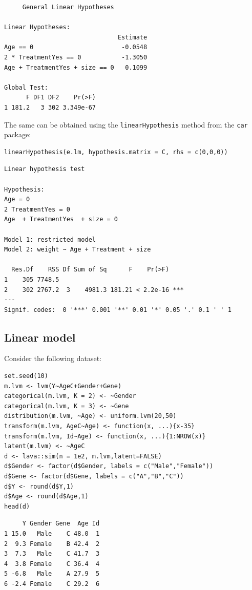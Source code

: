 \documentclass{article}
\begin{document}
\begin{verbatim}
	 General Linear Hypotheses

Linear Hypotheses:
                               Estimate
Age == 0                        -0.0548
2 * TreatmentYes == 0           -1.3050
Age + TreatmentYes + size == 0   0.1099

Global Test:
      F DF1 DF2    Pr(>F)
1 181.2   3 302 3.349e-67
\end{verbatim}

The same can be obtained using the \texttt{linearHypothesis} method from the \texttt{car} package:
\lstset{language=r,label= ,caption= ,captionpos=b,numbers=none}
\begin{lstlisting}
linearHypothesis(e.lm, hypothesis.matrix = C, rhs = c(0,0,0))
\end{lstlisting}

\begin{verbatim}
Linear hypothesis test

Hypothesis:
Age = 0
2 TreatmentYes = 0
Age  + TreatmentYes  + size = 0

Model 1: restricted model
Model 2: weight ~ Age + Treatment + size

  Res.Df    RSS Df Sum of Sq      F    Pr(>F)    
1    305 7748.5                                  
2    302 2767.2  3    4981.3 181.21 < 2.2e-16 ***
---
Signif. codes:  0 '***' 0.001 '**' 0.01 '*' 0.05 '.' 0.1 ' ' 1
\end{verbatim}

\subsection{Linear model}
\label{sec:org2f55f44}

Consider the following dataset:
\lstset{language=r,label= ,caption= ,captionpos=b,numbers=none}
\begin{lstlisting}
set.seed(10)
m.lvm <- lvm(Y~AgeC+Gender+Gene)
categorical(m.lvm, K = 2) <- ~Gender
categorical(m.lvm, K = 3) <- ~Gene
distribution(m.lvm, ~Age) <- uniform.lvm(20,50)
transform(m.lvm, AgeC~Age) <- function(x, ...){x-35}
transform(m.lvm, Id~Age) <- function(x, ...){1:NROW(x)}
latent(m.lvm) <- ~AgeC
d <- lava::sim(n = 1e2, m.lvm,latent=FALSE)
d$Gender <- factor(d$Gender, labels = c("Male","Female"))
d$Gene <- factor(d$Gene, labels = c("A","B","C"))
d$Y <- round(d$Y,1)
d$Age <- round(d$Age,1)
head(d)
\end{lstlisting}

\begin{verbatim}
     Y Gender Gene  Age Id
1 15.0   Male    C 48.0  1
2  9.3 Female    B 42.4  2
3  7.3   Male    C 41.7  3
4  3.8 Female    C 36.4  4
5 -6.8   Male    A 27.9  5
6 -2.4 Female    C 29.2  6
\end{verbatim}
\end{document}
